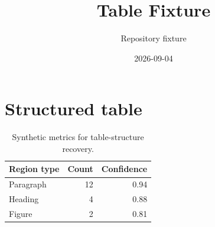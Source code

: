 \documentclass[11pt,a4paper]{article}
\title{Table Fixture}
\author{Repository fixture}
\date{2026-09-04}%
\begin{document}
\maketitle

\section{Structured table}
\begin{table}[htbp]
  \centering
  \begin{tabular}{lrr}
    \toprule
    Region type & Count & Confidence \\
    \midrule
    Paragraph   & 12    & 0.94       \\
    Heading     & 4     & 0.88       \\
    Figure      & 2     & 0.81       \\
    \bottomrule
  \end{tabular}
  \caption{Synthetic metrics for table-structure recovery.}
\end{table}
\end{document}

